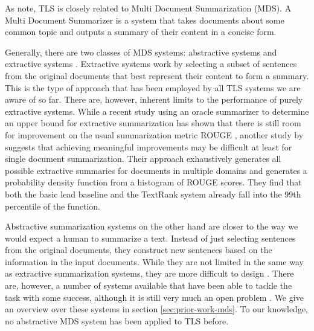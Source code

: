 \documentclass[a4paper,BCOR=10mm]{report}
\numberwithin{lemma}{chapter}
\numberwithin{definition}{chapter}
\begin{document}
As \citet{markert} note, TLS is closely related to Multi Document Summarization (MDS).
A Multi Document Summarizer is a system that takes documents about some common topic and outputs a summary of their content in a concise form.

Generally, there are two classes of MDS systems: abstractive systems and extractive systems \citep{a-brief-survey}. Extractive systems work by selecting a subset of sentences from the original documents that best represent their content to form a summary. This is the type of approach that has been employed by all TLS systems we are aware of so far.
There are, however, inherent limits to the performance of purely extractive systems. While a recent study \citep{hirao+nishino} using an oracle summarizer to determine an upper bound for extractive summarization has shown that there is still room for improvement on the usual summarization metric ROUGE \citep{rouge}, another study by \citet{ceylan+mihalcea} suggests that achieving meaningful improvements may be difficult at least for single document summarization. Their approach exhaustively generates all possible extractive summaries for documents in multiple domains and generates a probability density function from a histogram of ROUGE scores. They find that both the basic lead baseline and the TextRank system \citep{textrank} already fall into the 99th percentile of the function.

Abstractive summarization systems on the other hand are closer to the way we would expect a human to summarize a text. Instead of just selecting sentences from the original documents, they construct new sentences based on the information in the input documents. While they are not limited in the same way as extractive summarization systems, they are more difficult to design \citep{recent-advances, a-brief-survey}.
There are, however, a number of systems available that have been able to tackle the task with some success, although it is still very much an open problem \citep{recent-advances}. We give an overview over these systems in section \ref{sec:prior-work-mds}.
To our knowledge, no abstractive MDS system has been applied to TLS before.

\end{document}
